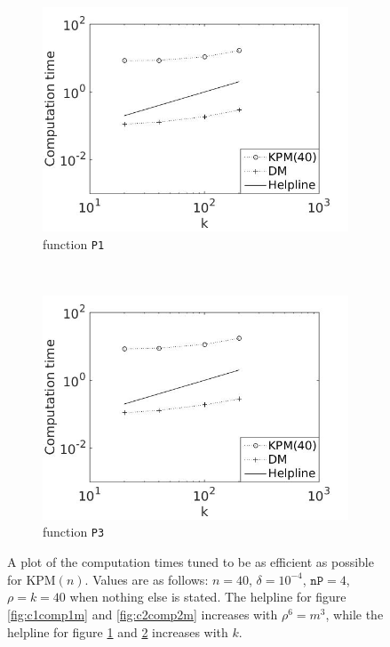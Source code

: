 \begin{figure}[H]
        \begin{subfigure}[b]{0.45\textwidth}
                \includegraphics[width=\textwidth]{fig/c3comp1k}
                \caption{function \texttt{P1}}
                \label{fig:c3comp1k}
        \end{subfigure}%
        ~
        \begin{subfigure}[b]{0.45\textwidth}
                \includegraphics[width=\textwidth]{fig/c4comp2k}
                \caption{function \texttt{P3}}
                \label{fig:c4comp2k}
        \end{subfigure}
        \caption{A plot of the computation times tuned to be as efficient as possible for KPM$(n)$. Values are as follows: $n = 40$, $\delta = 10^{-4}$, $\texttt{nP} = 4$, $\rho = k = 40$ when nothing else is stated. The helpline for figure \ref{fig:c1comp1m} and \ref{fig:c2comp2m} increases with $\rho^6 = m^3$, while the helpline for figure \ref{fig:c3comp1k} and \ref{fig:c4comp2k} increases with $k$.}\label{fig:comp}
        
\end{figure}
